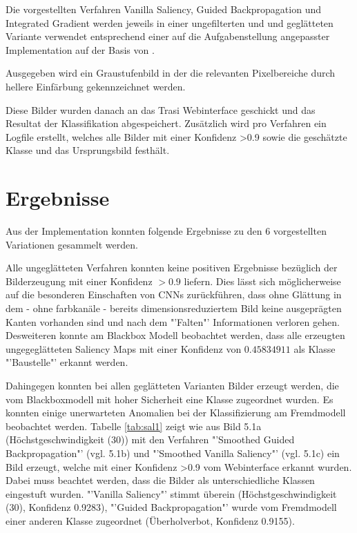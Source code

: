Die vorgestellten Verfahren Vanilla Saliency\cite{simonyan_deep_2013}, Guided Backpropagation\cite{springenberg_striving_2014} und Integrated Gradient\cite{sundararajan_axiomatic_2017} werden jeweils in einer ungefilterten und und geglätteten Variante verwendet entsprechend einer auf die Aufgabenstellung angepasster Implementation auf der Basis von \cite{anh_implementations_2019}. 

Ausgegeben wird ein Graustufenbild in der die relevanten Pixelbereiche durch hellere Einfärbung gekennzeichnet werden.

Diese Bilder wurden danach an das Trasi Webinterface geschickt und das Resultat der Klassifikation abgespeichert. Zusätzlich wird pro Verfahren ein Logfile erstellt, welches alle Bilder mit einer Konfidenz >0.9 sowie die geschätzte Klasse und das Ursprungsbild festhält.
%
%
%
%


\section{Ergebnisse}

Aus der Implementation konnten folgende Ergebnisse zu den 6 vorgestellten Variationen gesammelt werden. 

Alle ungeglätteten Verfahren konnten keine positiven Ergebnisse bezüglich der Bilderzeugung mit einer Konfidenz $> 0.9$ liefern. Dies lässt sich möglicherweise auf die besonderen Einschaften von \acp{CNN} zurückführen, dass ohne Glättung in dem - ohne farbkanäle - bereits dimensionsreduziertem Bild keine ausgeprägten Kanten vorhanden sind und nach dem "'Falten"' Informationen verloren gehen. Desweiteren konnte am Blackbox Modell beobachtet werden, dass alle erzeugten ungegeglätteten Saliency Maps mit einer Konfidenz von $0.45834911$ als Klasse "'Baustelle"' erkannt werden.

Dahingegen konnten bei allen geglätteten Varianten Bilder erzeugt werden, die vom Blackboxmodell mit hoher Sicherheit eine Klasse zugeordnet wurden. Es konnten einige unerwarteten Anomalien bei der Klassifizierung am Fremdmodell beobachtet werden.  Tabelle \ref{tab:sal1} zeigt wie aus Bild 5.1a (Höchstgeschwindigkeit (30))  mit den Verfahren "'Smoothed Guided Backpropagation"' (vgl. 5.1b) und "'Smoothed Vanilla Saliency"' (vgl. 5.1c) ein Bild erzeugt, welche mit einer Konfidenz >0.9 vom Webinterface erkannt wurden. Dabei muss beachtet werden, dass die Bilder als unterschiedliche Klassen eingestuft wurden. "'Vanilla Saliency"' stimmt überein (Höchstgeschwindigkeit (30), Konfidenz 0.9283), "'Guided Backpropagation"' wurde vom Fremdmodell einer anderen Klasse zugeordnet (Überholverbot, Konfidenz 0.9155).

